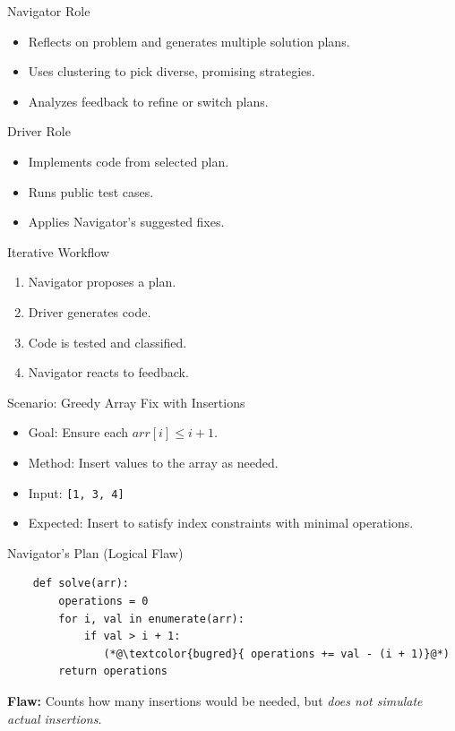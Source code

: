 \documentclass{beamer}
\begin{document}
	\begin{frame}{Navigator Role}
	  \begin{itemize}
	    \item Reflects on problem and generates multiple solution plans.
	    \item Uses clustering to pick diverse, promising strategies.
	    \item Analyzes feedback to refine or switch plans.
	  \end{itemize}
	\end{frame}
	
	\begin{frame}{Driver Role}
	  \begin{itemize}
	    \item Implements code from selected plan.
	    \item Runs public test cases.
	    \item Applies Navigator's suggested fixes.
	  \end{itemize}
	\end{frame}
	
	\begin{frame}{Iterative Workflow}
	  \begin{enumerate}
	    \item Navigator proposes a plan.
	    \item Driver generates code.
	    \item Code is tested and classified.
	    \item Navigator reacts to feedback.
	  \end{enumerate}
	\end{frame}
	
	\begin{frame}{Scenario: Greedy Array Fix with Insertions}
	  \begin{itemize}
	    \item Goal: Ensure each $arr[i] \leq i + 1$.
	    \item Method: Insert values to the array as needed.
	    \item Input: \texttt{[1, 3, 4]}
	    \item Expected: Insert to satisfy index constraints with minimal operations.
	  \end{itemize}
	\end{frame}

	
	\begin{frame}[fragile]{Navigator's Plan (Logical Flaw)}
	\begin{lstlisting}
	def solve(arr):
	    operations = 0
	    for i, val in enumerate(arr):
	        if val > i + 1:
	           (*@\textcolor{bugred}{ operations += val - (i + 1)}@*)
	    return operations
	\end{lstlisting}
	\vspace{1em}
	\textbf{Flaw:} Counts how many insertions would be needed, but \textit{does not simulate actual insertions}.
	\end{frame}
	
\end{document}
